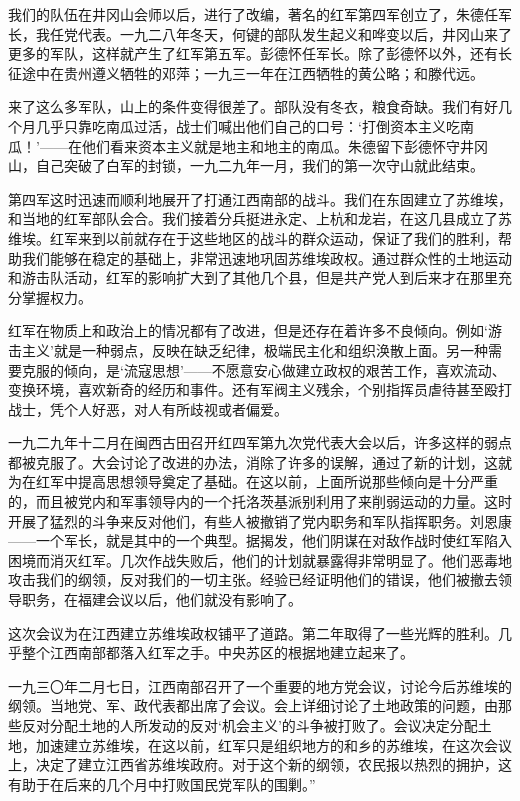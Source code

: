 \documentclass[10pt]{book}
\begin{document}
我们的队伍在井冈山会师以后，进行了改编，著名的红军第四军创立了，朱德任军长，我任党代表。一九二八年冬天，何键的部队发生起义和哗变以后，井冈山来了更多的军队，这样就产生了红军第五军。彭德怀任军长。除了彭德怀以外，还有长征途中在贵州遵义牺牲的邓萍；一九三一年在江西牺牲的黄公略；和滕代远。

来了这么多军队，山上的条件变得很差了。部队没有冬衣，粮食奇缺。我们有好几个月几乎只靠吃南瓜过活，战士们喊出他们自己的口号：‘打倒资本主义吃南瓜！’——在他们看来资本主义就是地主和地主的南瓜。朱德留下彭德怀守井冈山，自己突破了白军的封锁，一九二九年一月，我们的第一次守山就此结束。

第四军这时迅速而顺利地展开了打通江西南部的战斗。我们在东固建立了苏维埃，和当地的红军部队会合。我们接着分兵挺进永定、上杭和龙岩，在这几县成立了苏维埃。红军来到以前就存在于这些地区的战斗的群众运动，保证了我们的胜利，帮助我们能够在稳定的基础上，非常迅速地巩固苏维埃政权。通过群众性的土地运动和游击队活动，红军的影响扩大到了其他几个县，但是共产党人到后来才在那里充分掌握权力。

红军在物质上和政治上的情况都有了改进，但是还存在着许多不良倾向。例如‘游击主义’就是一种弱点，反映在缺乏纪律，极端民主化和组织涣散上面。另一种需要克服的倾向，是‘流寇思想’——不愿意安心做建立政权的艰苦工作，喜欢流动、变换环境，喜欢新奇的经历和事件。还有军阀主义残余，个别指挥员虐待甚至殴打战士，凭个人好恶，对人有所歧视或者偏爱。

一九二九年十二月在闽西古田召开红四军第九次党代表大会以后，许多这样的弱点都被克服了。大会讨论了改进的办法，消除了许多的误解，通过了新的计划，这就为在红军中提高思想领导奠定了基础。在这以前，上面所说那些倾向是十分严重的，而且被党内和军事领导内的一个托洛茨基派别利用了来削弱运动的力量。这时开展了猛烈的斗争来反对他们，有些人被撤销了党内职务和军队指挥职务。刘恩康——一个军长，就是其中的一个典型。据揭发，他们阴谋在对敌作战时使红军陷入困境而消灭红军。几次作战失败后，他们的计划就暴露得非常明显了。他们恶毒地攻击我们的纲领，反对我们的一切主张。经验已经证明他们的错误，他们被撤去领导职务，在福建会议以后，他们就没有影响了。

这次会议为在江西建立苏维埃政权铺平了道路。第二年取得了一些光辉的胜利。几乎整个江西南部都落入红军之手。中央苏区的根据地建立起来了。

一九三〇年二月七日，江西南部召开了一个重要的地方党会议，讨论今后苏维埃的纲领。当地党、军、政代表都出席了会议。会上详细讨论了土地政策的问题，由那些反对分配土地的人所发动的反对‘机会主义’的斗争被打败了。会议决定分配土地，加速建立苏维埃，在这以前，红军只是组织地方的和乡的苏维埃，在这次会议上，决定了建立江西省苏维埃政府。对于这个新的纲领，农民报以热烈的拥护，这有助于在后来的几个月中打败国民党军队的围剿。”
\end{document}
